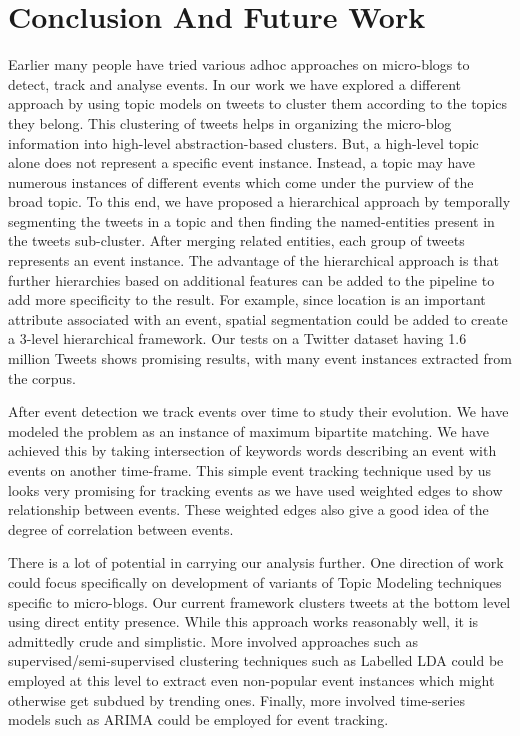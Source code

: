\chapter{Conclusion And Future Work}

Earlier many people have tried various adhoc approaches on micro-blogs to detect, track and analyse events. In our work we have explored a different approach by using topic models on tweets to cluster them according to the topics they belong. This clustering of tweets helps in organizing the micro-blog information into high-level abstraction-based clusters. But, a high-level topic alone does not represent a specific event instance. Instead, a topic may have numerous instances of different events which come under the purview of the broad topic. To this end, we have proposed a hierarchical approach by temporally segmenting the tweets in a topic and then finding the named-entities present in the tweets sub-cluster. After merging related entities, each group of tweets represents an event instance. The advantage of the hierarchical approach is that further hierarchies based on additional features can be added to the pipeline to add more specificity to the result. For example, since location is an important attribute associated with an event, spatial segmentation could be added to create a 3-level hierarchical framework. Our tests on a Twitter dataset having 1.6 million Tweets shows promising results, with many event instances extracted from the corpus.

After event detection we track events over time to study their evolution. We have modeled the problem as an instance of maximum bipartite matching. We have achieved this by taking intersection of keywords words describing an event with events on another time-frame. This simple event tracking technique used by us looks very promising for tracking events as we have used weighted edges to show relationship between events. These weighted edges also give a good idea of the degree of correlation between events.

There is a lot of potential in carrying our analysis further. One direction of work could focus specifically on development of variants of Topic Modeling techniques specific to micro-blogs. Our current framework clusters tweets at the bottom level using direct entity presence. While this approach works reasonably well, it is admittedly crude and simplistic. More involved approaches such as supervised/semi-supervised clustering techniques such as Labelled LDA \cite{ramage2009labeled} could be employed at this level to extract even non-popular event instances which might otherwise get subdued by trending ones. Finally, more involved time-series models such as ARIMA could be employed for event tracking.